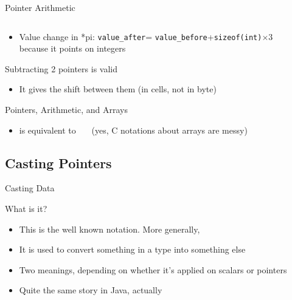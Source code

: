 \begin{Coupe}
\begin{frame}{Pointer Arithmetic}
\begin{columns}
\begin{column}{.55\linewidth}
    \end{column}    
  \end{columns}
  \begin{itemize}
  \item Value change in *pi:  \texttt{value\_after}= \texttt{value\_before}+\texttt{sizeof(int)}$\times3$\\
    because it points on integers
  \end{itemize}
  \begin{block}{Subtracting 2 pointers is valid} 
    \begin{itemize}
    \item It gives the shift between them (in cells, not in byte)
    \end{itemize}
  \end{block}


  \begin{block}{Pointers, Arithmetic, and Arrays}
    \begin{itemize}
    \item {} is equivalent to 
      ~~~(yes, C notations about arrays are messy)
    \end{itemize}
  \end{block}
\end{frame}
\subsection{Casting Pointers}\subtoc
\begin{frame}{Casting Data}
  \vspace{-.5\baselineskip}
  \begin{block}{What is it?}
    \begin{itemize}\vspace{-.2\baselineskip}
    \item This is the well known  notation. More generally, 
    \item It is used to convert something in a type into something else
    \item Two meanings, depending on whether it's applied on scalars or
      pointers
    \item Quite the same story in Java, actually
    \end{itemize}
  \end{block}\vspace{-.5\baselineskip}


\end{frame}
\end{Coupe}
